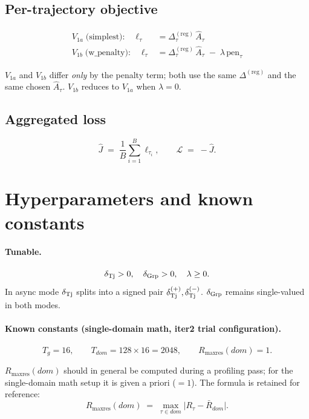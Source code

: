 \documentclass[11pt]{article}
\begin{document}
\subsection{Per-trajectory objective}

\begin{align}
V_{1a}\;\text{(simplest):}\quad
\ell_\tau &= \Delta_\tau^{(\mathrm{reg})}\,\hat A_\tau
  \label{eq:v1a} \\[2pt]
V_{1b}\;\text{(w\_penalty):}\quad
\ell_\tau &= \Delta_\tau^{(\mathrm{reg})}\,\hat A_\tau
            \;-\;\lambda\,\mathrm{pen}_\tau
  \label{eq:v1b}
\end{align}

$V_{1a}$ and $V_{1b}$ differ \emph{only} by the penalty term; both use
the same $\Delta^{(\mathrm{reg})}$ and the same chosen $\hat A_\tau$.
$V_{1b}$ reduces to $V_{1a}$ when $\lambda=0$.

\subsection{Aggregated loss}

\[
\hat J \;=\; \frac{1}{B}\sum_{i=1}^{B}\ell_{\tau_i},
\qquad
\mathcal L \;=\; -\hat J.
\]

\section{Hyperparameters and known constants}

\paragraph{Tunable.}
\[
\delta_{\rm Tj} > 0,\quad \delta_{\rm Grp} > 0,\quad \lambda \ge 0.
\]
In async mode $\delta_{\rm Tj}$ splits into a signed pair
$\delta_{\rm Tj}^{(+)}, \delta_{\rm Tj}^{(-)}$. $\delta_{\rm Grp}$
remains single-valued in both modes.

\paragraph{Known constants (single-domain math, iter2 trial configuration).}
\[
T_g = 16,\qquad
T_{dom} = 128\times 16 = 2048,\qquad
R_{\max\text{res}}(dom) = 1.
\]

$R_{\max\text{res}}(dom)$ should in general be computed during a
profiling pass; for the single-domain math setup it is given a priori
($=1$). The formula is retained for reference:
\[
R_{\max\text{res}}(dom) \;=\; \max_{\tau\in dom}\bigl|R_\tau - \bar R_{dom}\bigr|.
\]
\end{document}
